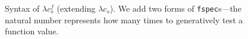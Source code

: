 %
\begin{figure}
\caption{Syntax of $\lambda c_s^f$ (extending $\lambda c_s$).
  We add two forms of \texttt{fspec}s---the natural number represents how
  many times to generatively test a function value.
  }
  \label{clojurespechof-grammar}
\end{figure}

